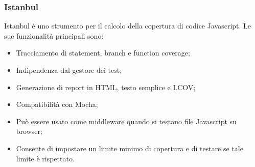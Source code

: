 \subsubsection{Istanbul}
\label{Instabull}
Istanbul è uno strumento per il calcolo della copertura di codice Javascript. Le sue funzionalità principali sono:
\begin{itemize}
\item Tracciamento di statement, branch e function coverage;
\item Indipendenza dal gestore dei test;
\item Generazione di report in HTML, testo semplice e LCOV;
\item Compatibilità con Mocha;
\item Può essere usato come middleware quando si testano file Javascript su browser;
\item Consente di impostare un limite minimo di copertura e di testare se tale limite è rispettato.
\end{itemize}



